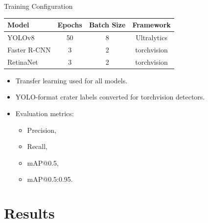 \documentclass{beamer}
\begin{document}
	\begin{frame}{Training Configuration}
		
		\begin{table}[h]
			\centering
			\begin{tabular}{lccc}
				\toprule
				Model & Epochs & Batch Size & Framework \\
				\midrule
				YOLOv8 & 50 & 8 & Ultralytics \\
				Faster R-CNN & 3 & 2 & torchvision \\
				RetinaNet & 3 & 2 & torchvision \\
				\bottomrule
			\end{tabular}
		\end{table}
		
		\vspace{0.4cm}
		
		\begin{itemize}
			\item Transfer learning used for all models.
			\item YOLO-format crater labels converted for torchvision detectors.
			\item Evaluation metrics:
			\begin{itemize}
				\item Precision,
				\item Recall,
				\item mAP@0.5,
				\item mAP@0.5:0.95.
			\end{itemize}
		\end{itemize}
		
	\end{frame}
	
	\section{Results}
	
\end{document}
